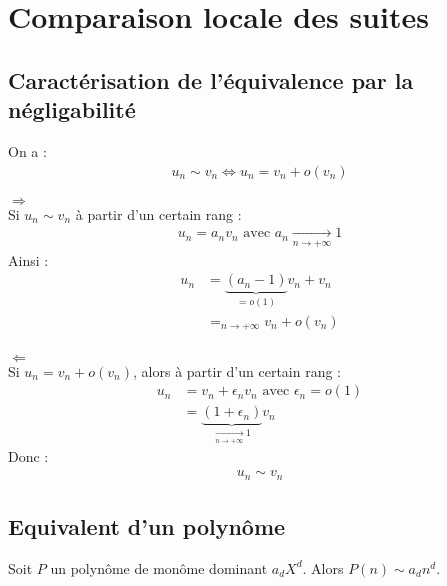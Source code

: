 \documentclass[../main.tex]{subfiles}
\begin{document}
\setcounter{chapter}{23}
\chapter{Comparaison locale des suites}
\tableofcontents
\clearpage

\section{Caractérisation de l'équivalence par la négligabilité}
\begin{tcolorbox}[title=Propostion 24.18, title filled=false, colframe=lightblue, colback=lightblue!10!white]
    On a : 
    \begin{align*}
        u_n \sim v_n \Leftrightarrow u_n = v_n + o(v_n)
    \end{align*}
\end{tcolorbox}

$\boxed{\Rightarrow}$ \\
Si $u_n \sim v_n$ à partir d'un certain rang : 
\begin{align*}
    u_n = a_n v_n \text{ avec } a_n \underset{n \to +\infty}{\longrightarrow} 1
\end{align*}
Ainsi : 
\begin{align*}
    u_n &= \underbrace{(a_n - 1)}_{= o(1)} v_n + v_n \\
    &=_{n\to +\infty} v_n + o(v_n)
\end{align*} \\

$\boxed{\Leftarrow}$ \\
Si $u_n = v_n + o(v_n)$, alors à partir d'un certain rang :
\begin{align*}
    u_n &= v_n + \epsilon_n v_n \text{ avec } \epsilon_n = o(1) \\
    &= \underbrace{(1 + \epsilon_n)}_{\underset{n \to +\infty}{\longrightarrow} 1} v_n
\end{align*}
Donc : 
\begin{align*}
    u_n \sim v_n
\end{align*}

\section{Equivalent d'un polynôme}
\begin{tcolorbox}[title=Propostion 24.20, title filled=false, colframe=lightblue, colback=lightblue!10!white]
    Soit $P$ un polynôme de monôme dominant $a_d X^d$. Alors $P(n) \sim a_d n^d$.
\end{tcolorbox}
\end{document}
